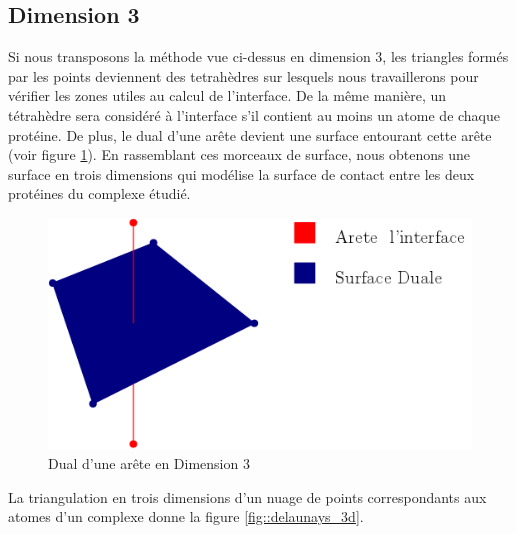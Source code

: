 \subsection*{Dimension 3}

Si nous transposons la méthode vue ci-dessus en dimension 3, les triangles formés
par les points deviennent des tetrahèdres sur lesquels nous travaillerons pour vérifier
les zones utiles au calcul de l'interface. De la même manière, un tétrahèdre sera considéré
à l'interface s'il contient au moins un atome de chaque protéine.
De plus, le dual d'une arête devient une surface entourant cette arête (voir figure
 \ref{fig::dual_3d}). En rassemblant ces morceaux
de surface, nous obtenons une surface en trois dimensions qui modélise la surface
de contact entre les deux protéines du complexe étudié.

\begin{figure}[ht]
\centering
  \includegraphics[width=\textwidth]{figures/dual_3d.png}
  \caption{Dual d'une arête en Dimension 3}
  \label{fig::dual_3d}
\end{figure}

La triangulation en trois dimensions d'un nuage de points correspondants aux atomes
d'un complexe donne la figure \ref{fig::delaunays_3d}.

